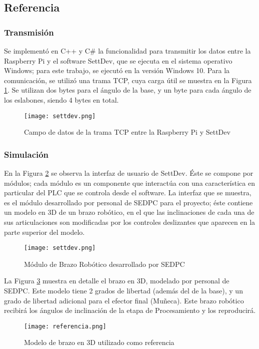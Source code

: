 \subsection{Referencia}

\subsubsection{Transmisión}

Se implementó en C++ y C\# la funcionalidad para transmitir los datos entre la Raspberry Pi y el software SettDev, que se ejecuta en el sistema operativo Windows; para este trabajo, se ejecutó en la versión Windows 10. Para la comunicación, se utilizó una trama TCP, cuya carga útil se muestra en la Figura \ref{fig:tramatcp}. Se utilizan dos bytes para el ángulo de la base, y un byte para cada ángulo de los eslabones, siendo 4 bytes en total.

\begin{figure}[htb]
	\centering
	\texttt{[image: settdev.png]}
	\caption{Campo de datos de la trama TCP entre la Raspberry Pi y SettDev}
	\label{fig:tramatcp}
\end{figure}

\subsubsection{Simulación}

En la Figura \ref{fig:settdev} se observa la interfaz de usuario de SettDev. Éste se compone por módulos; cada módulo es un componente que interactúa con una característica en particular del PLC que se controla desde el software. La interfaz que se muestra, es el módulo desarrollado por personal de SEDPC para el proyecto; éste contiene un modelo en 3D de un brazo robótico, en el que las inclinaciones de cada una de sus articulaciones son modificadas por los controles deslizantes que aparecen en la parte superior del modelo.

\begin{figure}[htb]
	\centering
	\texttt{[image: settdev.png]}
	\caption{Módulo de Brazo Robótico desarrollado por SEDPC}
	\label{fig:settdev}
\end{figure}

La Figura \ref{fig:referencia} muestra en detalle el brazo en 3D, modelado por personal de SEDPC. Este modelo tiene 2 grados de libertad (además del de la base), y un grado de libertad adicional para el efector final (Muñeca). Este brazo robótico recibirá los ángulos de inclinación de la etapa de Procesamiento y los reproducirá.

\begin{figure}[htb]
	\centering
	\texttt{[image: referencia.png]}
	\caption{Modelo de brazo en 3D utilizado como referencia}
	\label{fig:referencia}
\end{figure}